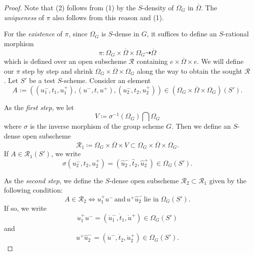 \documentclass[10pt,a4paper]{amsart}
\begin{document}
\begin{proof}
    Note that (2) follows from (1) by the $S$-density of $\Omega_G$ in $\overline{\Omega}$. The \emph{uniqueness} of $\pi$ also follows from this reason and (1).

    
    For the \emph{existence} of $\pi$, since $\Omega_G$ is $S$-dense in $G$, it suffices to define an $S$-rational morphism $$\pi\colon\Omega_G\times\overline{\Omega}\times\Omega_G\dashrightarrow \overline{\Omega}$$
    which is defined over an open subscheme $\mathcal{R}$ containing $e\times\overline{\Omega}\times e$.
    We will define our $\pi$ step by step and shrink $\Omega_G\times\overline{\Omega}\times\Omega_G$ along the way to obtain the sought $\mathcal{R}$. 
    Let $S'$ be a test $S$-scheme.
    Consider an element
    $$A:=((u_1^-,t_1, u_1^+),(u^-,t, u^+),(u_2^-,t_2, u_2^+))\in (\Omega_G\times\overline{\Omega}\times\Omega_G)(S').$$
    
    
    As the \emph{first step}, we let 
    $$V\coloneq\sigma^{-1}(\Omega_G)\bigcap \Omega_G$$
    where $\sigma$ is the inverse morphism of the group scheme $G$. Then we define an $S$-dense open subscheme 
    $$\mathcal{R}_1\coloneq\Omega_G\times\overline{\Omega}\times  V\subset\Omega_G\times\overline{\Omega}\times\Omega_G.$$
    If $A\in \mathcal{R}_1(S')$, we write 
    $$\sigma(u_2^-,t_2, u_2^+)=(\hat{u}_2^-,\hat{t}_2, \hat{u}_2^+)\in \Omega_G(S').$$
    
    As the \emph{second step}, we define 
    the $S$-dense open subscheme $\mathcal{R}_2\subset\mathcal{R}_1$ given by the following condition:
    $$A\in \mathcal{R}_2\iff
    u_1^+u^-\, \text{and}\,u^+\hat{u}_2^-\, \text{lie in}\; \Omega_G(S').$$
    If so, we write 
    \begin{equation}\label{comutequation1}
        u_1^+u^-=(\dot{u}_1^-, \dot{t}_1, \dot{u}^+)\in\Omega_G(S')
    \end{equation} 
    and 
    \begin{equation}\label{comutequation2}
        u^+\hat{u}_2^-=(\dot{u}^- ,\dot{t}_2 ,\dot{u}_2^+)\in\Omega_G(S').
    \end{equation}
    
    
    


\end{proof}
\end{document}
